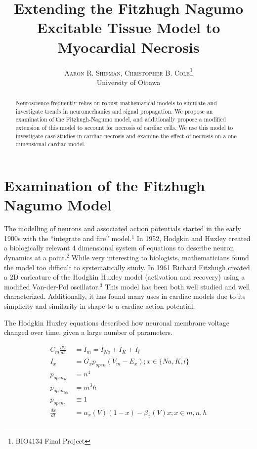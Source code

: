 \documentclass[11pt]{report}
\title{\vspace{-15mm}\fontsize{24pt}{10pt}\selectfont\textbf{Extending the Fitzhugh Nagumo Excitable Tissue
Model to Myocardial Necrosis}} %
\author{
\large
\textsc{Aaron R. Shifman, Christopher B. Cole}\thanks{BIO4134 Final Project}\\[2mm] %
\normalsize University of Ottawa \\ %
\vspace{-5mm}
}
\date{}
\begin{document}
\maketitle %

\thispagestyle{fancy} %


\begin{abstract}

Neuroscience frequently relies on robust mathematical models to simulate and investigate trends in neuromechanics and signal propagation. We propose an examination of the Fitzhugh-Nagumo model, and additionally propose a modified extension of this model to account for necrosis of cardiac cells. We use this model to investigate case studies in cardiac necrosis and examine the effect of necrosis on a one dimensional cardiac model. 
\end{abstract}


\newpage

\tableofcontents

\newpage

\chapter{Examination of the Fitzhugh Nagumo Model}

The modelling of neurons and associated action potentials started in the early 1900s with the ``integrate and fire'' model.$^1$ In 1952, Hodgkin and Huxley created a biologically relevant 4 dimensional system of equations to describe neuron dynamics at a point.$^2$ While very interesting to biologists, mathematicians found the model too difficult to systematically study. In 1961 Richard Fitzhugh created a 2D caricature of the Hodgkin Huxley model (activation and recovery) using a modified Van-der-Pol oscillator.$^3$ This model has been both well studied and well characterized. Additionally, it has found many uses in cardiac models due to its simplicity and similarity in shape to a cardiac action potential. 

The Hodgkin Huxley equations described how neuronal membrane voltage changed over time, given a large number of parameters. 

\begin{align}
C_m \frac{dV}{dt} &= I_m = I_{Na} + I_{K} + I_l \\
I_x &= \bar{G_x}p_{open}(V_m-E_x); x\in\{Na,K,l\}\\
p_{open_{K}} &= n^4\\
p_{open_{Na}} &= m^3h\\
p_{open_{l}} &\equiv 1\\
\frac{dx}{dt} &= \alpha_x(V)(1-x)-\beta_x(V)x; x\in{m,n,h}\\
\end{align}
\end{document}
